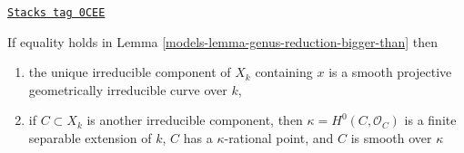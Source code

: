 \begin{lemma}
\label{models-lemma-equality-genus-reduction-bigger-than}
\href{https://stacks.math.columbia.edu/tag/0CEE}{\texttt{Stacks tag 0CEE}}

If equality holds in Lemma \ref{models-lemma-genus-reduction-bigger-than}
then
\begin{enumerate}
\item the unique irreducible component of $X_k$ containing
$x$ is a smooth projective geometrically irreducible curve
over $k$,
\item if $C \subset X_k$ is another irreducible component, then
$\kappa = H^0(C, \mathcal{O}_C)$ is a finite separable extension
of $k$, $C$ has a $\kappa$-rational point, and $C$ is smooth over $\kappa$
\end{enumerate}
\end{lemma}

